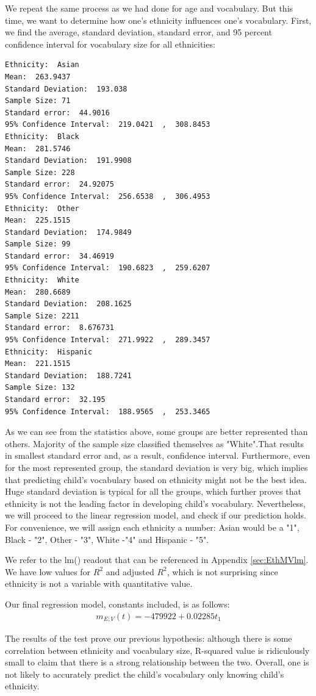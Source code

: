 \documentclass[11pt]{article}  %
\begin{document}
\indent We repeat the same process as we had done for age and vocabulary. But this time, we want to determine how one's ethnicity influences one's vocabulary.
First, we find the average, standard deviation, standard error, and 95 percent confidence interval for vocabulary size for all ethnicities:
\begin{lstlisting}[basicstyle=\small]
Ethnicity:  Asian
Mean:  263.9437
Standard Deviation:  193.038
Sample Size: 71
Standard error:  44.9016
95% Confidence Interval:  219.0421  ,  308.8453
Ethnicity:  Black
Mean:  281.5746
Standard Deviation:  191.9908
Sample Size: 228
Standard error:  24.92075
95% Confidence Interval:  256.6538  ,  306.4953
Ethnicity:  Other
Mean:  225.1515
Standard Deviation:  174.9849
Sample Size: 99
Standard error:  34.46919
95% Confidence Interval:  190.6823  ,  259.6207
Ethnicity:  White
Mean:  280.6689
Standard Deviation:  208.1625
Sample Size: 2211
Standard error:  8.676731
95% Confidence Interval:  271.9922  ,  289.3457
Ethnicity:  Hispanic
Mean:  221.1515
Standard Deviation:  188.7241
Sample Size: 132
Standard error:  32.195
95% Confidence Interval:  188.9565  ,  253.3465
\end{lstlisting}
As we can see from the statistics above, some groups are better represented than others. Majority of the sample size classified themselves as "White".That results in smallest standard error and, as a result, confidence interval. Furthermore, even for the most represented group, the standard deviation is very big, which implies that predicting child's vocabulary based on ethnicity might not be the best idea. Huge standard deviation is typical for all the groups, which further proves that ethnicity is not the leading factor in developing child's vocabulary. 
Nevertheless, we will proceed to the linear regression model, and check if our prediction holds.
For convenience, we will assign each ethnicity a number: Asian would be a "1", Black - "2", Other - "3", White -"4"  and Hispanic - "5".

We refer to the lm() readout that can be referenced in Appendix \ref{sec:EthMVlm}. We have low values for $R^2$ and adjusted $R^2$, which is not surprising since ethnicity is not a variable with quantitative value.

Our final regression model, constants included, is as follows:
    \begin{align*}
        m_{E;V}(t) = -479922 + 0.02285 t_1
    \end{align*}
    
The results of the test prove our previous hypothesis: although there is some correlation between ethnicity and vocabulary size, R-squared value is ridiculously small to claim that there is a strong relationship between the two.
Overall, one is not likely to accurately predict the child's vocabulary only knowing child's ethnicity.
\end{document}
